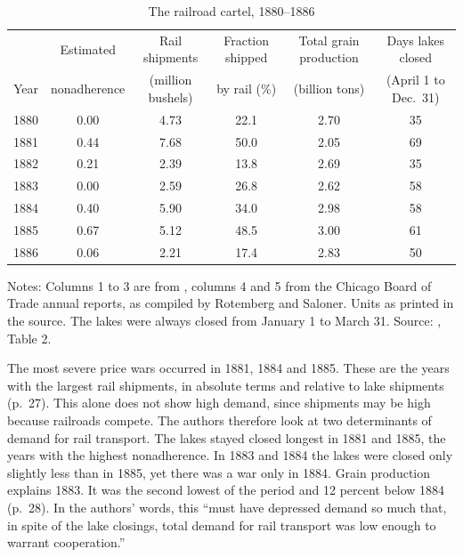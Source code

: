 \begin{table}[htbp]
\centering
\caption{The railroad cartel, 1880--1886}\label{tab:12-rs-railroads}
\small
\setlength{\tabcolsep}{3pt}
\begin{tabular}{@{}lccccc@{}}
\toprule
 & Estimated & Rail shipments & Fraction shipped & Total grain production & Days lakes closed\\
Year & nonadherence & (million bushels) & by rail (\%) & (billion tons) & (April 1 to Dec.\ 31)\\
\midrule
1880 & 0.00 & 4.73 & 22.1 & 2.70 & 35\\
1881 & 0.44 & 7.68 & 50.0 & 2.05 & 69\\
1882 & 0.21 & 2.39 & 13.8 & 2.69 & 35\\
1883 & 0.00 & 2.59 & 26.8 & 2.62 & 58\\
1884 & 0.40 & 5.90 & 34.0 & 2.98 & 58\\
1885 & 0.67 & 5.12 & 48.5 & 3.00 & 61\\
1886 & 0.06 & 2.21 & 17.4 & 2.83 & 50\\
\bottomrule
\end{tabular}

\smallskip
\begin{minipage}{0.92\textwidth}
\footnotesize
Notes: Columns 1 to 3 are from \citet{Porter1983}, columns 4 and 5 from the Chicago Board of Trade annual reports,
as compiled by Rotemberg and Saloner. Units as printed in the source. The lakes were always closed from January 1 to
March 31. Source: \citet{RotembergSaloner1984}, Table 2.
\end{minipage}
\end{table}

The most severe price wars occurred in 1881, 1884 and 1885. These are the years with the largest rail shipments, in
absolute terms and relative to lake shipments (p.~27). This alone does not show high demand, since shipments may be
high because railroads compete. The authors therefore look at two determinants of demand for rail transport. The
lakes stayed closed longest in 1881 and 1885, the years with the highest nonadherence. In 1883 and 1884 the lakes
were closed only slightly less than in 1885, yet there was a war only in 1884. Grain production explains 1883. It was
the second lowest of the period and 12 percent below 1884 (p.~28). In the authors' words, this ``must have depressed
demand so much that, in spite of the lake closings, total demand for rail transport was low enough to warrant
cooperation.''

